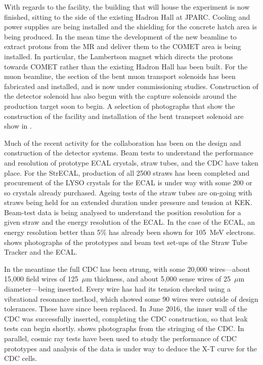 \FigStatusFacility
With regards to the facility, the building that will house the experiment is now finished, sitting to the side of the existing Hadron Hall at \ac{JPARC}.
Cooling and power supplies are being installed and the shielding for the concrete hatch area is being produced.
In the mean time the development of the new beamline to extract protons from the \ac{MR} and deliver them to the COMET area is being installed.
In particular, the Lambertson magnet which directs the protons towards COMET rather than the existing Hadron Hall has been built.
For the muon beamline, the \phaseI section of the bent muon transport solenoids has been fabricated and installed, and is now under commissioning studies.
Construction of the detector solenoid has also begun with the capture solenoids around the production target soon to begin.
A selection of photographs that show the construction of the facility and installation of the bent transport solenoid are show in .

\FigStatusStrECAL
Much of the recent activity for the collaboration has been on the design and construction of the detector systems.
Beam tests to understand the performance and resolution of prototype ECAL crystals, straw tubes, and the \ac{CDC} have taken place.
For the \ac{StrECAL}, production of all 2500 \phaseI straws has been completed and procurement of the \ac{LYSO} crystals for the ECAL is under way with some 200 or so crystals already purchased.
Ageing tests of the straw tubes are on-going with straws being held for an extended duration under pressure and tension at KEK.
Beam-test data is being analysed to understand the position resolution for a given straw and the energy resolution of the ECAL.
In the case of the ECAL, an energy resolution better than 5\% has already been shown for 105~MeV electrons.
 shows photographs of the prototypes and beam test set-ups of the Straw Tube Tracker and the ECAL.

\FigStatusCyDet
In the meantime the full \ac{CDC} has been strung, with some 20,000 wires---about 15,000 field wires of 125~$\mu$m thickness, and about 5,000 sense wires of 25~$\mu$m diameter---being inserted.
Every wire has had its tension checked using a vibrational resonance method, which showed some 90 wires were outside of design tolerances.  These have since been replaced.
In June 2016, the inner wall of the CDC was successfully inserted, completing the CDC construction, so that leak tests can begin shortly.  
 shows photographs from the stringing of the \ac{CDC}.
In parallel, cosmic ray tests have been used to study the performance of CDC prototypes and analysis of the data is under way to deduce the X-T curve for the CDC cells.

